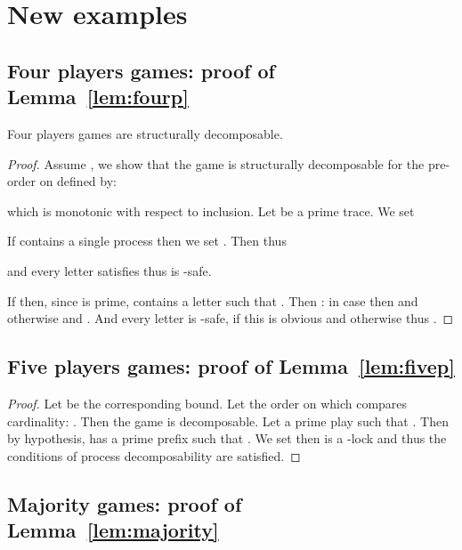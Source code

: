 \documentclass[a4paper,UKenglish]{lipics-v2016}
\begin{document}
\section{New examples}




\subsection{Four players games: proof of Lemma~\ref{lem:fourp}}

{
Four players games are  structurally decomposable.
}
\begin{proof}
Assume ,
we show that the game is structurally decomposable for  the pre-order  on  defined by:

which is monotonic with respect to inclusion.
Let  be a prime trace.
We set

If  contains a single process  then we set . Then  thus

and every letter  satisfies  thus is -safe.

If  
then, since  is prime,  contains a letter 
such that .
Then :
in case  then 
and otherwise 
and
.
And every letter  is -safe,
if  this is obvious
and otherwise  
thus .
\end{proof}

\subsection{Five players games: proof of Lemma~\ref{lem:fivep}}

\begin{proof}
Let  be the corresponding bound.
Let  the order on  which compares cardinality:
.
Then the game is  decomposable.
Let  a prime play such that 
.
Then by hypothesis,  has a prime prefix  such that 
.
We set  then  is a -lock
and 
thus the conditions of process decomposability are satisfied.
\end{proof}

\subsection{Majority games: proof of Lemma~\ref{lem:majority}}
\end{document}
